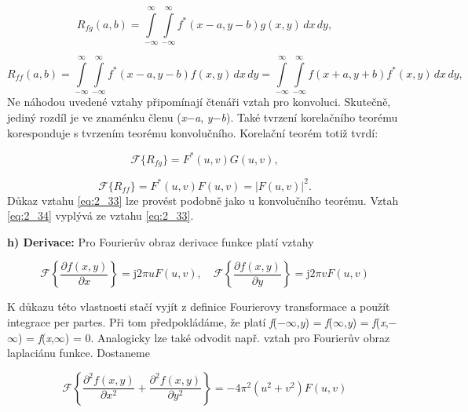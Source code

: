 \begin{equation} \label{eq:2_31}
    R_{fg} (a, b) = \int\limits_{-\infty}^{\infty} \int\limits_{-\infty}^{\infty} f^*(x - a, y - b) g(x, y)\,dx\,dy,
\end{equation}

\begin{equation} \label{eq:2_32}
    R_{ff} (a, b) = \int\limits_{-\infty}^{\infty} \int\limits_{-\infty}^{\infty} f^*(x - a, y - b) f(x, y)\,dx\,dy = \int\limits_{-\infty}^{\infty} \int\limits_{-\infty}^{\infty} f(x + a, y + b) f^*(x, y)\,dx\,dy,
\end{equation}
Ne náhodou uvedené vztahy připomínají čtenáři vztah pro konvoluci. Skutečně, jediný rozdíl je ve znaménku členu (\textit{x}$-$\textit{a}, \textit{y}$-$\textit{b}). Také tvrzení korelačního teorému koresponduje s tvrzením teorému konvolučního. Korelační teorém totiž tvrdí:

\begin{equation} \label{eq:2_33}
    \mathscr{F}\{R_{fg}\} = F^*(u, v) G(u, v),
\end{equation}

\begin{equation} \label{eq:2_34}
    \mathscr{F}\{R_{ff}\} = F^*(u, v) F(u, v) = |F(u, v)|^2.
\end{equation}
Důkaz vztahu \eqref{eq:2_33} lze provést podobně jako u konvolučního teorému. Vztah \eqref{eq:2_34} vyplývá ze vztahu \eqref{eq:2_33}.

\noindent \textbf{h) Derivace: }Pro Fourierův obraz derivace funkce platí vztahy

\begin{equation} \label{eq:2_35}
    \mathscr{F}\left\{\frac{\partial f(x, y)}{\partial x}\right\} = \mathrm{j} 2 \pi u F(u, v), \quad \mathscr{F}\left\{\frac{\partial f(x, y)}{\partial y}\right\} = \mathrm{j} 2 \pi v F(u, v)
\end{equation}

\noindent K důkazu této vlastnosti stačí vyjít z definice Fourierovy transformace a použít integrace per partes. Při tom předpokládáme, že platí  \textit{f}($-$$\infty$,\textit{y}) = \textit{f}($\infty$,\textit{y}) = \textit{f}(\textit{x},$-$$\infty$) = \textit{f}(\textit{x},$\infty$) = 0.  Analogicky lze také odvodit např. vztah pro Fourierův obraz laplaciánu funkce. Dostaneme

\begin{equation} \label{eq:2_36}
    \mathscr{F}\left\{\frac{\partial^2 f(x, y)}{\partial x^2} + \frac{\partial^2 f(x, y)}{\partial y^2} \right\} = - 4 \pi^2 ( u^2 + v^2 ) F(u, v)
\end{equation}


